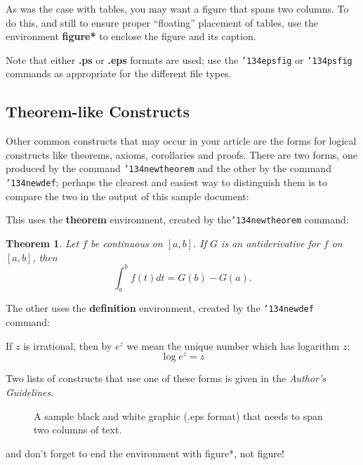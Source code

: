 \documentclass{acm_proc_article-sp}
\begin{document}
As was the case with tables, you may want a figure
that spans two columns.  To do this, and still to
ensure proper ``floating'' placement of tables, use the environment
\textbf{figure*} to enclose the figure and its caption.

Note that either {\textbf{.ps}} or {\textbf{.eps}} formats are
used; use
the \texttt{{\char'134}epsfig} or \texttt{{\char'134}psfig}
commands as appropriate for the different file types.

\subsection{Theorem-like Constructs}
Other common constructs that may occur in your article are
the forms for logical constructs like theorems, axioms,
corollaries and proofs.  There are
two forms, one produced by the
command \texttt{{\char'134}newtheorem} and the
other by the command \texttt{{\char'134}newdef}; perhaps
the clearest and easiest way to distinguish them is
to compare the two in the output of this sample document:

This uses the \textbf{theorem} environment, created by
the\linebreak\texttt{{\char'134}newtheorem} command:
\newtheorem{theorem}{Theorem}
\begin{theorem}
Let $f$ be continuous on $[a,b]$.  If $G$ is
an antiderivative for $f$ on $[a,b]$, then
\begin{displaymath}\int^b_af(t)dt = G(b) - G(a).\end{displaymath}
\end{theorem}

The other uses the \textbf{definition} environment, created
by the \texttt{{\char'134}newdef} command:
\begin{definition}
If $z$ is irrational, then by $e^z$ we mean the
unique number which has
logarithm $z$: \begin{displaymath}{\log e^z = z}\end{displaymath}
\end{definition}

Two lists of constructs that use one of these
forms is given in the
\textit{Author's  Guidelines}.

\begin{figure*}
\centering
\caption{A sample black and white graphic (.eps format)
that needs to span two columns of text.}
\end{figure*}
and don't forget to end the environment with
{figure*}, not {figure}!
 
\end{document}
